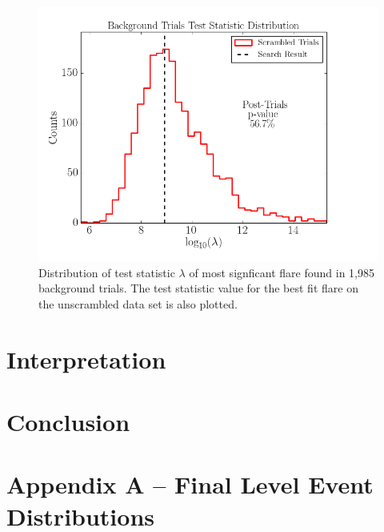 \documentclass{gatech-thesis}
\begin{document}
\begin{figure}[ht]
  \begin{center}
    \includegraphics[width=1.0\textwidth,keepaspectratio]{TestStatisticDistribution_WithResult.png}
  \end{center}
  \caption{Distribution of test statistic $\lambda$ of most signficant flare found in 1,985 background trials. The test statistic value for the best fit flare on the unscrambled data set is also plotted.}
  \label{fig:RealSkyMap}
\end{figure}

\chapter{Interpretation}



\chapter{Conclusion}

\appendix
\chapter{Appendix A -- Final Level Event Distributions}


\begin{postliminary}
{}

\begin{vita}

\end{vita}
\end{postliminary}
\end{document}

